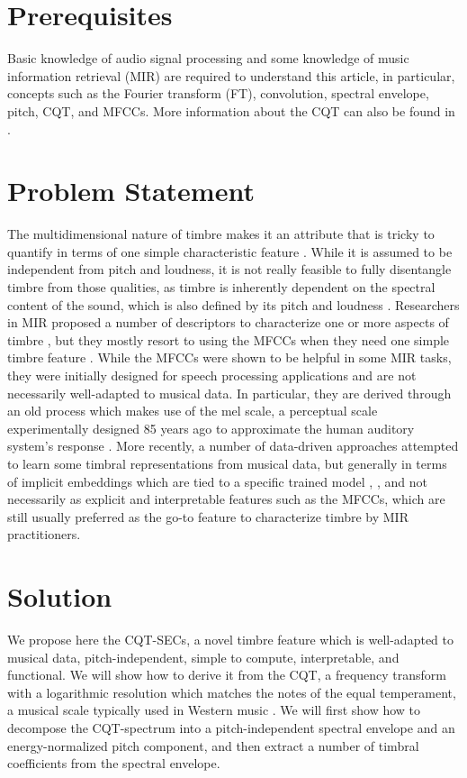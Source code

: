 \documentclass[journal]{IEEEtran}
\begin{document}
\section{Prerequisites}

Basic knowledge of audio signal processing and some knowledge of music information retrieval (MIR) \cite{mueller2007} are required to understand this article, in particular, concepts such as the Fourier transform (FT), convolution, spectral envelope, pitch, CQT, and MFCCs. More information about the CQT can also be found in \cite{brown1991, brown1992}.


\section{Problem Statement}

The multidimensional nature of timbre makes it an attribute that is tricky to quantify in terms of one simple characteristic feature \cite{grey1977}. While it is assumed to be independent from pitch and loudness, it is not really feasible to fully disentangle timbre from those qualities, as timbre is inherently dependent on the spectral content of the sound, which is also defined by its pitch and loudness \cite{moore2004}. Researchers in MIR proposed a number of descriptors to characterize one or more aspects of timbre \cite{peeters2011}, but they mostly resort to using the MFCCs when they need one simple timbre feature \cite{mueller2007}. While the MFCCs were shown to be helpful in some MIR tasks, they were initially designed for speech processing applications \cite{mermelstein1976} and are not necessarily well-adapted to musical data. In particular, they are derived through an old process which makes use of the mel scale, a perceptual scale experimentally designed 85 years ago to approximate the human auditory system's response \cite{stevens1937}. More recently, a number of data-driven approaches attempted to learn some timbral representations from musical data, but generally in terms of implicit embeddings which are tied to a specific trained model \cite{engel2017}, \cite{pons2017}, and not necessarily as explicit and interpretable features such as the MFCCs, which are still usually preferred as the go-to feature to characterize timbre by MIR practitioners.


\section{Solution}

We propose here the CQT-SECs, a novel timbre feature which is well-adapted to musical data, pitch-independent, simple to compute, interpretable, and functional. We will show how to derive it from the CQT, a frequency transform with a logarithmic resolution which matches the notes of the equal temperament, a musical scale typically used in Western music \cite{brown1991, brown1992}. We will first show how to decompose the CQT-spectrum into a pitch-independent spectral envelope and an energy-normalized pitch component, and then extract a number of timbral coefficients from the spectral envelope. 
\end{document}
